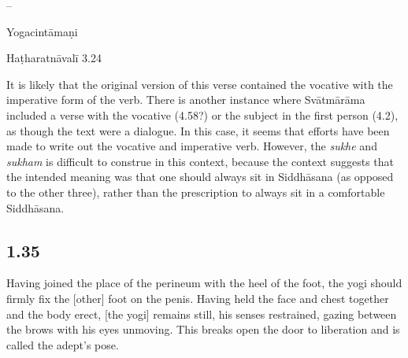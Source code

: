 \begin{ekdosis}
\begin{sources}[hp01_034]
--
\end{sources}

\begin{testimonia}[hp01_034]
Yogacintāmaṇi

\begin{versinnote}
\end{versinnote}

Haṭharatnāvalī 3.24

\begin{versinnote}
\end{versinnote}

\end{testimonia}

\begin{philcomm}[hp01_034]
It is likely that the original version of this verse contained the vocative with the imperative form of the verb. There is another instance where Svātmārāma included a verse with the vocative (4.58?) or the subject in the first person (4.2), as though the text were a dialogue. In this case, it seems that efforts have been made to write out the vocative and imperative verb. However, the \emph{sukhe} and \emph{sukham} is difficult to construe in this context, because the context suggests that the intended meaning was that one should always sit in Siddhāsana (as opposed to the other three), rather than the prescription to always sit in a comfortable Siddhāsana.   
\end{philcomm}

\subsection*{1.35}
\begin{translation}[hp01_035]
Having joined the place of the perineum with the heel of the foot, the yogi should firmly fix the [other] foot on the penis. Having held the face and chest together and the body erect, [the yogi] remains still, his senses restrained, gazing between the brows with his eyes unmoving. This breaks open the door to liberation and is called the adept’s pose.
\end{translation}


\end{ekdosis}
